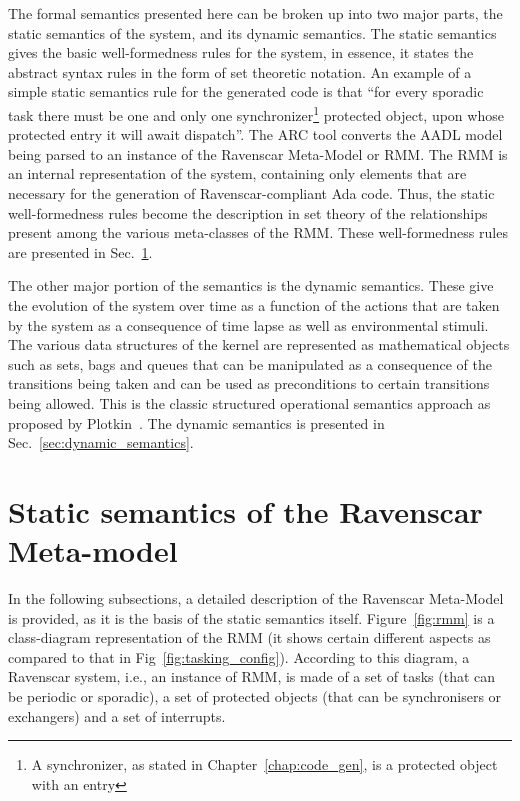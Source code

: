 The formal semantics presented here can be broken up into two major
parts, the static semantics of the system, and its dynamic
semantics. The static semantics gives the basic well-formedness rules
for the system, in essence, it states the abstract syntax rules in the
form of set theoretic notation. An example of a simple static
semantics rule for the generated code is that ``for every sporadic
task there must be one and only one synchronizer\footnote{A
  synchronizer, as stated in Chapter~\ref{chap:code_gen}, is a
  protected object with an entry} protected object, upon whose
protected entry it will await dispatch''. The ARC tool converts the
AADL model being parsed to an instance of the Ravenscar Meta-Model or
RMM. The RMM is an internal representation of the system, containing
only elements that are necessary for the generation of
Ravenscar-compliant Ada code. Thus, the static well-formedness rules
become the description in set theory of the relationships present
among the various meta-classes of the RMM. These well-formedness rules
are presented in Sec.~\ref{sec:static_semantics}.

The other major portion of the semantics is the dynamic
semantics. These give the evolution of the system over time as a
function of the actions that are taken by the system as a consequence
of time lapse as well as environmental stimuli. The various data
structures of the kernel are represented as mathematical objects such
as sets, bags and queues that can be manipulated as a consequence of
the transitions being taken and can be used as preconditions to
certain transitions being allowed. This is the classic structured
operational semantics approach as proposed by
Plotkin~\cite{plotkin-sos}. The dynamic semantics is presented in
Sec.~\ref{sec:dynamic_semantics}. 

\section{Static semantics of the Ravenscar Meta-model}
\label{sec:static_semantics}

In the following subsections, a detailed description of the Ravenscar
Meta-Model is provided, as it is the basis of the static semantics
itself. Figure~\ref{fig:rmm} is a class-diagram representation of the
RMM (it shows certain different aspects as compared to that in
Fig~\ref{fig:tasking_config}). According to this diagram, a Ravenscar
system, i.e., an instance of RMM, is made of a set of tasks (that can
be periodic or sporadic), a set of protected objects (that can be
synchronisers or exchangers) and a set of interrupts.

